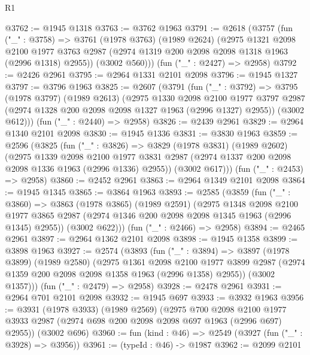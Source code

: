 \begin{lexlean}{R1}
\begin{coremodule}
@3762 := @1945 @1318
@3763 := @3762 @1963
@3791 := @2618
    (@3757
      (fun ("_" : @3758) =>
      @3761
        (@1978 @3763)
        (@1989 @2624)
        (@2975
          @1321
          @2098
          @2100
          @1977
          @3763
          @2987
          (@2974 @1319 @200 @2098 @2098 @1318 @1963 (@2996 @1318) @2955))
        (@3002 @560)))
    (fun ("_" : @2427) => @2958)
@3792 := @2426 @2961
@3795 := @2964 @1331 @2101 @2098
@3796 := @1945 @1327
@3797 := @3796 @1963
@3825 := @2607
    (@3791
      (fun ("_" : @3792) =>
      @3795
        (@1978 @3797)
        (@1989 @2613)
        (@2975
          @1330
          @2098
          @2100
          @1977
          @3797
          @2987
          (@2974 @1328 @200 @2098 @2098 @1327 @1963 (@2996 @1327) @2955))
        (@3002 @612)))
    (fun ("_" : @2440) => @2958)
@3826 := @2439 @2961
@3829 := @2964 @1340 @2101 @2098
@3830 := @1945 @1336
@3831 := @3830 @1963
@3859 := @2596
    (@3825
      (fun ("_" : @3826) =>
      @3829
        (@1978 @3831)
        (@1989 @2602)
        (@2975
          @1339
          @2098
          @2100
          @1977
          @3831
          @2987
          (@2974 @1337 @200 @2098 @2098 @1336 @1963 (@2996 @1336) @2955))
        (@3002 @617)))
    (fun ("_" : @2453) => @2958)
@3860 := @2452 @2961
@3863 := @2964 @1349 @2101 @2098
@3864 := @1945 @1345
@3865 := @3864 @1963
@3893 := @2585
    (@3859
      (fun ("_" : @3860) =>
      @3863
        (@1978 @3865)
        (@1989 @2591)
        (@2975
          @1348
          @2098
          @2100
          @1977
          @3865
          @2987
          (@2974 @1346 @200 @2098 @2098 @1345 @1963 (@2996 @1345) @2955))
        (@3002 @622)))
    (fun ("_" : @2466) => @2958)
@3894 := @2465 @2961
@3897 := @2964 @1362 @2101 @2098
@3898 := @1945 @1358
@3899 := @3898 @1963
@3927 := @2574
    (@3893
      (fun ("_" : @3894) =>
      @3897
        (@1978 @3899)
        (@1989 @2580)
        (@2975
          @1361
          @2098
          @2100
          @1977
          @3899
          @2987
          (@2974 @1359 @200 @2098 @2098 @1358 @1963 (@2996 @1358) @2955))
        (@3002 @1357)))
    (fun ("_" : @2479) => @2958)
@3928 := @2478 @2961
@3931 := @2964 @701 @2101 @2098
@3932 := @1945 @697
@3933 := @3932 @1963
@3956 := @3931
    (@1978 @3933)
    (@1989 @2569)
    (@2975
      @700
      @2098
      @2100
      @1977
      @3933
      @2987
      (@2974 @698 @200 @2098 @2098 @697 @1963 (@2996 @697) @2955))
    (@3002 @696)
@3960 := fun (kind : @46) => @2549 (@3927 (fun ("_" : @3928) => @3956))
@3961 := (typeId : @46) -> @1987
@3962 := @2099 @2101

\end{coremodule}
\end{lexlean}
